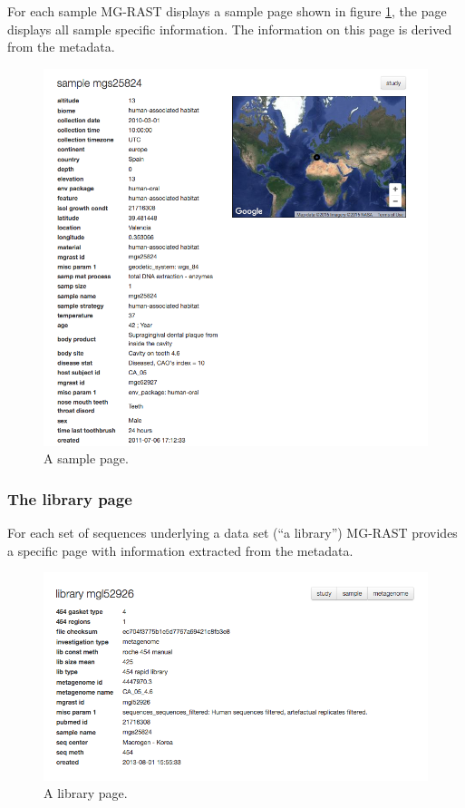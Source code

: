 \documentclass[12pt,fullpage]{report}
\begin{document}
For each sample MG-RAST displays a sample page shown in figure \ref{fig:v4-sample-page}, the page displays all sample specific information. The information on this page is derived from the metadata.


\begin{figure}
\begin{center}
\includegraphics[width=6in]{Images/v4-sample-page.png}
\end{center}
\caption{
A sample page.
}
\label{fig:v4-sample-page}
\end{figure}

\subsubsection*{The library page}

For each set of sequences underlying a data set (``a library'') MG-RAST provides a specific page with information extracted from the metadata.

\begin{figure}
\begin{center}
\includegraphics[width=6in]{Images/v4-library-page.png}
\end{center}
\caption{
A library page.
}
\label{fig:v4-library-page}
\end{figure}
\end{document}
